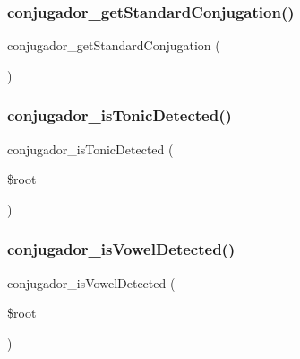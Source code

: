 \subsubsection{\texorpdfstring{conjugador\+\_\+get\+Standard\+Conjugation()}{conjugador\_getStandardConjugation()}}
{\footnotesize\ttfamily conjugador\+\_\+get\+Standard\+Conjugation (\begin{DoxyParamCaption}{ }\end{DoxyParamCaption})}

\hypertarget{php_2conjugador__gr3_8inc_a3920febe59bd11cb42cd71eb1ecc1877}{}\label{php_2conjugador__gr3_8inc_a3920febe59bd11cb42cd71eb1ecc1877} 
\subsubsection{\texorpdfstring{conjugador\+\_\+is\+Tonic\+Detected()}{conjugador\_isTonicDetected()}}
{\footnotesize\ttfamily conjugador\+\_\+is\+Tonic\+Detected (\begin{DoxyParamCaption}\item[{}]{\$root }\end{DoxyParamCaption})}

\hypertarget{php_2conjugador__gr3_8inc_a688122e728649856c4dede0a1c1fabb5}{}\label{php_2conjugador__gr3_8inc_a688122e728649856c4dede0a1c1fabb5} 
\subsubsection{\texorpdfstring{conjugador\+\_\+is\+Vowel\+Detected()}{conjugador\_isVowelDetected()}}
{\footnotesize\ttfamily conjugador\+\_\+is\+Vowel\+Detected (\begin{DoxyParamCaption}\item[{}]{\$root }\end{DoxyParamCaption})}

\hypertarget{php_2conjugador__gr3_8inc_a1cfc9cf5cbbb005b55985d39ed2201c4}{}\label{php_2conjugador__gr3_8inc_a1cfc9cf5cbbb005b55985d39ed2201c4} 
